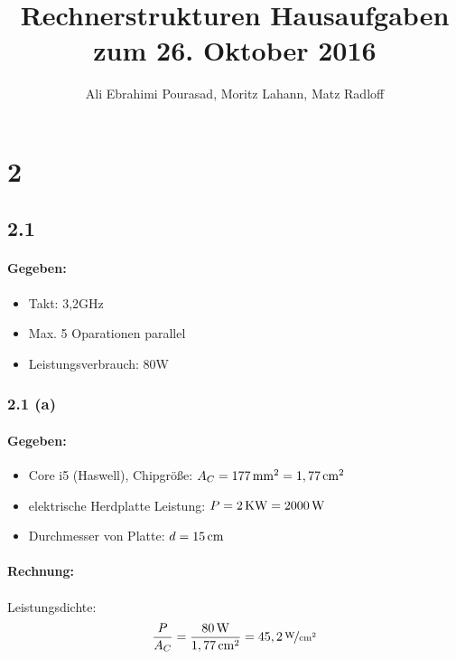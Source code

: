 \documentclass[11pt,a4paper]{article}
\title{\textbf{Rechnerstrukturen Hausaufgaben zum 26. Oktober 2016}}
\author{Ali Ebrahimi Pourasad, Moritz Lahann, Matz Radloff}
\begin{document}
  \maketitle
  \date{}
  \tableofcontents
  \newpage

\section{2} %

\subsection{2.1} %

\paragraph{Gegeben:}
\begin{itemize}
  \item Takt: 3,2GHz
  \item Max. 5 Oparationen parallel
  \item Leistungsverbrauch: 80W
\end{itemize}


\subsubsection{2.1 (a)}
\paragraph{Gegeben:}
\begin{itemize}
  \item Core i5 (Haswell), Chipgröße: $A_C = \unit[177]{mm^2} = \unit[1,77]{cm^2}$
  \item elektrische Herdplatte Leistung: $P = \unit[2]{KW} = \unit[2000]{W}$
  \item Durchmesser von Platte: $d = \unit[15]{cm}$
\end{itemize}

\paragraph{Rechnung:}
\paragraph{}Leistungsdichte:
\begin{equation*}
\frac{P}{A_C} = \frac{\unit[80]{W}}{\unit[1,77]{cm^2}} = \unitfrac[45,2]{W}{cm^2}
\end{equation*}
\end{document}
